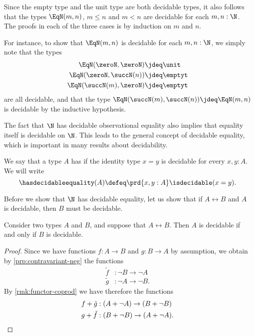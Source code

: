 \begin{eg}\label{eg:is-decidable-EqN}
  Since the empty type and the unit type are both decidable types, it also follows that the types $\EqN(m,n)$, $m\leq n$ and $m<n$ are decidable for each $m,n:\N$. The proofs in each of the three cases is by induction on $m$ and $n$.

  For instance, to show that $\EqN(m,n)$ is decidable for each $m,n:\N$, we simply note that the types
  \begin{align*}
    \EqN(\zeroN,\zeroN) & \jdeq \unit \\
    \EqN(\zeroN,\succN(n)) & \jdeq \emptyt \\
    \EqN(\succN(m),\zeroN) & \jdeq \emptyt 
  \end{align*}
  are all decidable, and that the type $\EqN(\succN(m),\succN(n))\jdeq \EqN(m,n)$ is decidable by the inductive hypothesis.
\end{eg}

The fact that $\N$ has decidable observational equality also implies that equality itself is decidable on $\N$. This leads to the general concept of decidable equality, which is important in many results about decidability.

\begin{defn}
  We say that a type $A$ has  if the identity type $x=y$ is decidable for every $x,y:A$. We will write
  \begin{equation*}
    \hasdecidableequality(A)\defeq \prd{x,y:A}\isdecidable(x=y).
  \end{equation*}
\end{defn}

Before we show that $\N$ has decidable equality, let us show that if $A\leftrightarrow B$ and $A$ is decidable, then $B$ must be decidable.

\begin{lem}\label{lem:is-decidable-iff}
  Consider two types $A$ and $B$, and suppose that $A\leftrightarrow B$. Then $A$ is decidable if and only if $B$ is decidable.
\end{lem}

\begin{proof}
  Since we have functions $f:A\to B$ and $g:B\to A$ by assumption, we obtain by \cref{prp:contravariant-neg} the functions
  \begin{align*}
    \tilde{f} & : \neg B\to\neg A \\
    \tilde{g} & : \neg A \to \neg B.
  \end{align*}
  By \cref{rmk:functor-coprod} we have therefore the functions
  \begin{align*}
    f+\tilde{g} & : (A+\neg A) \to (B+\neg B) \\
    g+\tilde{f} & : (B+\neg B) \to (A+\neg A).\qedhere
  \end{align*}
\end{proof}

